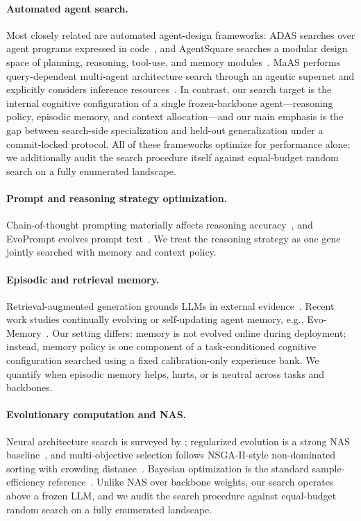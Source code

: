 \documentclass[11pt]{article}
\begin{document}
\paragraph{Automated agent search.}
Most closely related are automated agent-design frameworks: ADAS searches
over agent programs expressed in code~\citep{hu2024adas}, and AgentSquare
searches a modular design space of planning, reasoning, tool-use, and memory
modules~\citep{shang2025agentsquare}. MaAS performs query-dependent
multi-agent architecture search through an agentic supernet and explicitly
considers inference resources~\citep{zhang2025maas}. In contrast, our search
target is the internal cognitive configuration of a single frozen-backbone
agent---reasoning policy, episodic memory, and context allocation---and our
main emphasis is the gap between search-side specialization and held-out
generalization under a commit-locked protocol. All of these frameworks
optimize for performance alone; we additionally audit the search procedure
itself against equal-budget random search on a fully enumerated landscape.

\paragraph{Prompt and reasoning strategy optimization.}
Chain-of-thought prompting materially affects reasoning
accuracy~\citep{wei2022cot}, and EvoPrompt evolves prompt
text~\citep{guo2024evoprompt}. We treat the reasoning strategy as one gene
jointly searched with memory and context policy.

\paragraph{Episodic and retrieval memory.}
Retrieval-augmented generation grounds LLMs in external
evidence~\citep{lewis2020rag}. Recent work studies continually evolving or
self-updating agent memory, e.g., Evo-Memory~\citep{wei2025evomemory}. Our
setting differs: memory is not evolved online during deployment; instead,
memory policy is one component of a task-conditioned cognitive configuration
searched using a fixed calibration-only experience bank. We quantify when
episodic memory helps, hurts, or is neutral across tasks and backbones.

\paragraph{Evolutionary computation and NAS.}
Neural architecture search is surveyed by \citet{elsken2019nas};
regularized evolution is a strong NAS baseline~\citep{real2019ameoba}, and
multi-objective selection follows NSGA-II-style non-dominated sorting with
crowding distance~\citep{deb2002nsga2}. Bayesian optimization is the
standard sample-efficiency reference~\citep{shahriari2016bayesopt}. Unlike
NAS over backbone weights, our search operates above a frozen LLM, and we
audit the search procedure against equal-budget random search on a fully
enumerated landscape.
\end{document}

